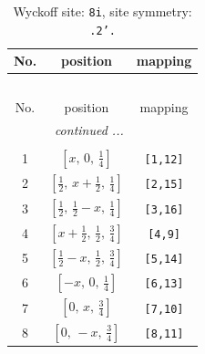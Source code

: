 \documentclass[fleqn,8pt]{jsarticle}
\begin{document}
\begin{longtable}{ccc}
\caption{Wyckoff site: {\tt 8i}, site symmetry: {\tt .2'.}}
 \\
 \hline \hline
No. & position & mapping \\ \hline \endfirsthead

\multicolumn{2}{l}{\tablename\ \thetable{}} \\
 \hline \hline
No. & position & mapping \\ \hline \endhead

 \hline \hline
\multicolumn{2}{r}{\footnotesize\it continued ...} \\ \endfoot

 \hline \hline
\multicolumn{2}{r}{} \\ \endlastfoot

1 & $\left[ x,\, 0,\, \frac{1}{4} \right]$ & {\tt [1,12]} \\ \hline
2 & $\left[ \frac{1}{2},\, x + \frac{1}{2},\, \frac{1}{4} \right]$ & {\tt [2,15]} \\ \hline
3 & $\left[ \frac{1}{2},\, \frac{1}{2} - x,\, \frac{1}{4} \right]$ & {\tt [3,16]} \\ \hline
4 & $\left[ x + \frac{1}{2},\, \frac{1}{2},\, \frac{3}{4} \right]$ & {\tt [4,9]} \\ \hline
5 & $\left[ \frac{1}{2} - x,\, \frac{1}{2},\, \frac{3}{4} \right]$ & {\tt [5,14]} \\ \hline
6 & $\left[ - x,\, 0,\, \frac{1}{4} \right]$ & {\tt [6,13]} \\ \hline
7 & $\left[ 0,\, x,\, \frac{3}{4} \right]$ & {\tt [7,10]} \\ \hline
8 & $\left[ 0,\, - x,\, \frac{3}{4} \right]$ & {\tt [8,11]} \\
\end{longtable}
\renewcommand{\arraystretch}{1.2}
\end{document}
